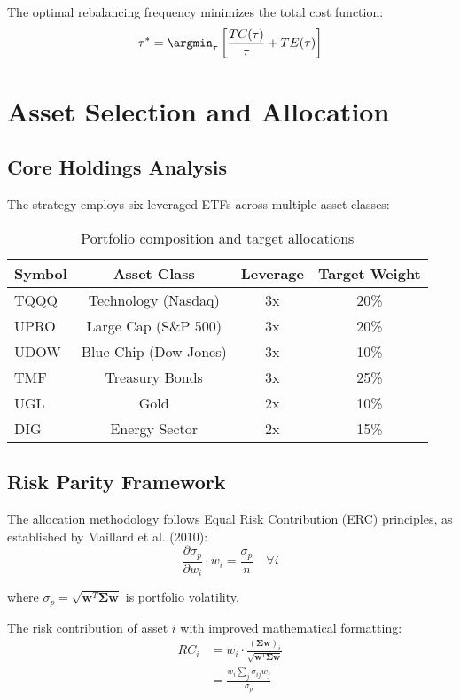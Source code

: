 \documentclass[onecolumn,ieee]{arithmaxresearch}
\begin{document}
The optimal rebalancing frequency minimizes the total cost function:
\begin{equation}
\tau^* = \argmin_\tau \left[ \frac{TC(\tau)}{\tau} + TE(\tau) \right]
\end{equation}

\section{Asset Selection and Allocation}

\subsection{Core Holdings Analysis}

The strategy employs six leveraged ETFs across multiple asset classes:

\begin{table}[h]
\centering
\begin{tabular}{lccc}
\toprule
Symbol & Asset Class & Leverage & Target Weight \\
\midrule
TQQQ & Technology (Nasdaq) & 3x & 20\% \\
UPRO & Large Cap (S\&P 500) & 3x & 20\% \\
UDOW & Blue Chip (Dow Jones) & 3x & 10\% \\
TMF & Treasury Bonds & 3x & 25\% \\
UGL & Gold & 2x & 10\% \\
DIG & Energy Sector & 2x & 15\% \\
\bottomrule
\end{tabular}
\caption{Portfolio composition and target allocations}
\end{table}

\subsection{Risk Parity Framework}

The allocation methodology follows Equal Risk Contribution (ERC) principles, as established by Maillard et al. (2010):
\begin{equation}
\frac{\partial \sigma_p}{\partial w_i} \cdot w_i = \frac{\sigma_p}{n} \quad \forall i
\end{equation}

where $\sigma_p = \sqrt{\mathbf{w}^T \boldsymbol{\Sigma} \mathbf{w}}$ is portfolio volatility.

The risk contribution of asset $i$ with improved mathematical formatting:
\begin{equation}
\begin{aligned}
RC_i &= w_i \cdot \frac{(\boldsymbol{\Sigma} \mathbf{w})_i}{\sqrt{\mathbf{w}^T \boldsymbol{\Sigma} \mathbf{w}}} \\
&= \frac{w_i \sum_j \sigma_{ij}w_j}{\sigma_p}
\end{aligned}
\end{equation}
\end{document}
